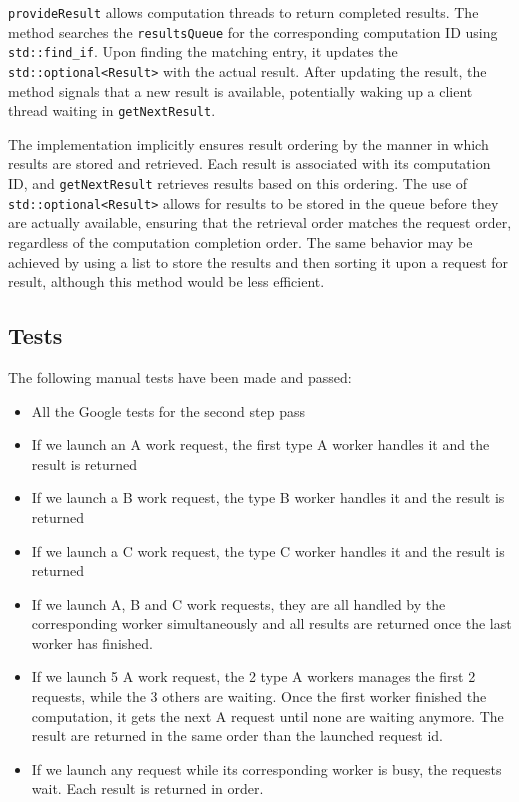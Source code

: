 \documentclass{article}
\begin{document}
    \texttt{provideResult} allows computation threads to return completed results.
    The method searches the \texttt{resultsQueue} for the corresponding computation ID using \texttt{std::find\_if}.
    Upon finding the matching entry, it updates the \texttt{std::optional<Result>} with the actual result.
    After updating the result, the method signals that a new result is available, potentially waking up a client thread waiting in \texttt{getNextResult}.

    The implementation implicitly ensures result ordering by the manner in which results are stored and retrieved.
    Each result is associated with its computation ID, and \texttt{getNextResult} retrieves results based on this ordering.
    The use of \texttt{std::optional<Result>} allows for results to be stored in the queue before they are actually available, ensuring that the retrieval order matches the request order, regardless of the computation completion order.
    The same behavior may be achieved by using a list to store the results and then sorting it upon a request for result, although this method would be less efficient.

    \subsection*{Tests}

    The following manual tests have been made and passed:
    \begin{itemize}
        \item All the Google tests for the second step pass
        \item If we launch an A work request, the first type A worker handles it and the result is returned
        \item If we launch a B work request, the type B worker handles it and the result is returned
        \item If we launch a C work request, the type C worker handles it and the result is returned
        \item If we launch A, B and C work requests, they are all handled by the corresponding worker simultaneously and all results are returned once the last worker has finished.
        \item If we launch 5 A work request, the 2 type A workers manages the first 2 requests, while the 3 others are waiting. Once the first worker finished the computation, it gets the next A request until none are waiting anymore. The result are returned in the same order than the launched request id.
        \item If we launch any request while its corresponding worker is busy, the requests wait. Each result is returned in order.
    \end{itemize}
\end{document}
